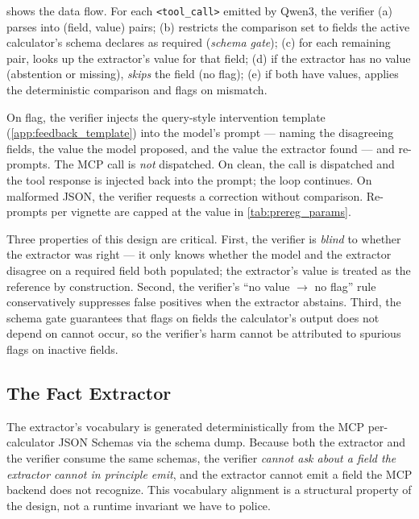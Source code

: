  shows the data flow. For each
\verb|<tool_call>| emitted by Qwen3, the verifier
(a) parses  into (field, value)
pairs;
(b) restricts the comparison set to fields the active calculator's
schema declares as required (\emph{schema gate});
(c) for each remaining pair, looks up the extractor's value for that
field;
(d) if the extractor has no value (abstention or missing),
\emph{skips} the field (no flag);
(e) if both have values, applies the deterministic comparison and
flags on mismatch.



On flag, the verifier injects the query-style intervention template
(\cref{app:feedback_template}) into the model's prompt --- naming
the disagreeing fields, the value the model proposed, and the value
the extractor found --- and re-prompts. The MCP call is \emph{not}
dispatched. On clean, the call is dispatched and the tool response is
injected back into the prompt; the loop continues. On malformed JSON,
the verifier requests a correction without comparison. Re-prompts
per vignette are capped at the value in \cref{tab:prereg_params}.

Three properties of this design are critical. First, the verifier is
\emph{blind} to whether the extractor was right --- it only knows
whether the model and the extractor disagree on a required field both
populated; the extractor's value is treated as the reference by
construction. Second, the verifier's ``no value $\rightarrow$ no
flag'' rule conservatively suppresses false positives when the
extractor abstains. Third, the schema gate guarantees that flags on
fields the calculator's output does not depend on cannot occur, so
the verifier's harm cannot be attributed to spurious flags on
inactive fields.

\subsection{The Fact Extractor}
\label{sec:methods_extractor}

The extractor's vocabulary is generated deterministically from the
MCP per-calculator JSON Schemas via the schema dump. Because both
the extractor and the verifier consume the same schemas, the
verifier \emph{cannot ask about a field the extractor cannot in
principle emit}, and the extractor cannot emit a field the MCP
backend does not recognize. This vocabulary alignment is a
structural property of the design, not a runtime invariant we have
to police.

